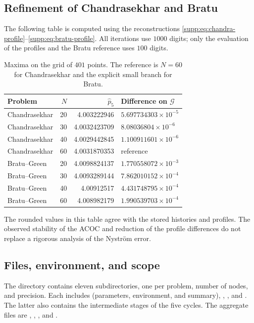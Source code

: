 \documentclass[11pt,a4paper]{article}
\numberwithin{equation}{section}
\numberwithin{table}{section}
\theoremstyle{plain}
\theoremstyle{definition}\newtheorem{definition}[theorem]{Definition}
\theoremstyle{remark}\newtheorem{remark}[theorem]{Remark}
\begin{document}
\subsection{Refinement of Chandrasekhar and Bratu}
The following table is computed using the reconstructions
\eqref{supp:eq:chandra-profile}--\eqref{supp:eq:bratu-profile}.
All iterations use $1000$ digits; only the evaluation of the
profiles and the Bratu reference uses $100$ digits.
\begin{table}[htbp]\centering\small
\begin{tabular}{@{}lrrl@{}}\toprule
Problem & $N$ & $\widehat p_5$ & Difference on $\mathcal G$\\\midrule
Chandrasekhar & 20 & 4.003222946 & $5.697734303\times10^{-5}$\\
Chandrasekhar & 30 & 4.0032423709 & $8.08036804\times10^{-6}$\\
Chandrasekhar & 40 & 4.0029442845 & $1.100911601\times10^{-6}$\\
Chandrasekhar & 60 & 4.0031870353 & reference\\
Bratu--Green & 20 & 4.0098824137 & $1.770558072\times10^{-3}$\\
Bratu--Green & 30 & 4.0093289144 & $7.862010152\times10^{-4}$\\
Bratu--Green & 40 & 4.00912517 & $4.431748795\times10^{-4}$\\
Bratu--Green & 60 & 4.008982179 & $1.990539703\times10^{-4}$\\
\bottomrule\end{tabular}
\caption{Maxima on the grid of $401$ points. The reference is $N=60$
for Chandrasekhar and the explicit small branch for Bratu.}
\label{supp:tab:refinement}
\end{table}
The rounded values in this table agree with the stored histories and profiles. The observed stability of the ACOC
and reduction of the profile differences do not replace a rigorous
analysis of the Nystr\"om error.

\subsection{Files, environment, and scope}
The directory  contains eleven
subdirectories, one per problem, number of nodes, and precision.
Each includes  (parameters, environment, and
summary), , ,
and . The latter also contains the
intermediate stages of the five cycles. The aggregate files are
, ,
, and .
\end{document}
